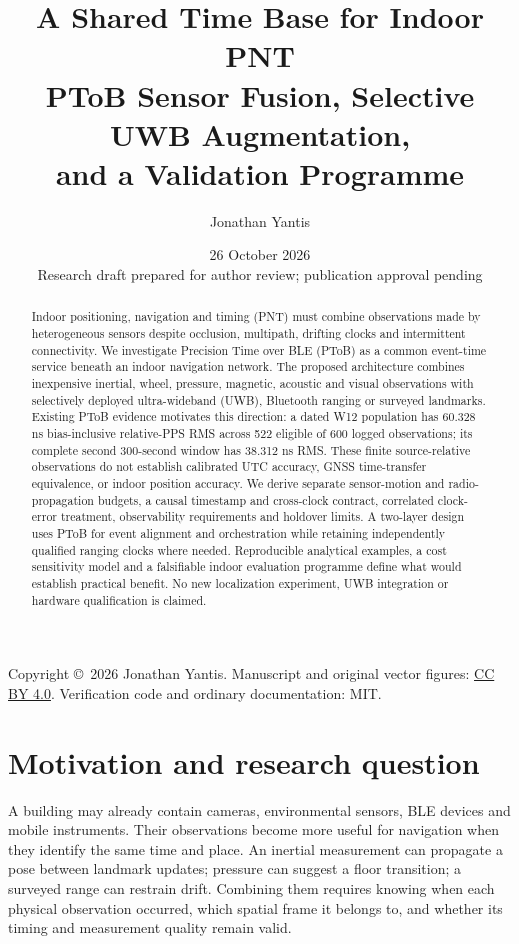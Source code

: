 \documentclass[11pt,letterpaper]{article}
\begin{document}
\title{\vspace{-1.3em}A Shared Time Base for Indoor PNT\\[5pt]\large PToB Sensor Fusion, Selective UWB Augmentation,\\and a Validation Programme}
\author{Jonathan Yantis}
\date{26 October 2026\\\small Research draft prepared for author review; publication approval pending}
\maketitle
\begin{abstract}
Indoor positioning, navigation and timing (PNT) must combine observations made by heterogeneous sensors despite occlusion, multipath, drifting clocks and intermittent connectivity. We investigate Precision Time over BLE (PToB) as a common event-time service beneath an indoor navigation network. The proposed architecture combines inexpensive inertial, wheel, pressure, magnetic, acoustic and visual observations with selectively deployed ultra-wideband (UWB), Bluetooth ranging or surveyed landmarks. Existing PToB evidence motivates this direction: a dated W12 population has 60.328 ns bias-inclusive relative-PPS RMS across 522 eligible of 600 logged observations; its complete second 300-second window has 38.312 ns RMS. These finite source-relative observations do not establish calibrated UTC accuracy, GNSS time-transfer equivalence, or indoor position accuracy. We derive separate sensor-motion and radio-propagation budgets, a causal timestamp and cross-clock contract, correlated clock-error treatment, observability requirements and holdover limits. A two-layer design uses PToB for event alignment and orchestration while retaining independently qualified ranging clocks where needed. Reproducible analytical examples, a cost sensitivity model and a falsifiable indoor evaluation programme define what would establish practical benefit. No new localization experiment, UWB integration or hardware qualification is claimed.
\end{abstract}
\noindent\small Copyright \copyright\ 2026 Jonathan Yantis. Manuscript and original vector figures: \href{https://creativecommons.org/licenses/by/4.0/}{CC BY 4.0}. Verification code and ordinary documentation: MIT.\normalsize

\section{Motivation and research question}
A building may already contain cameras, environmental sensors, BLE devices and mobile instruments. Their observations become more useful for navigation when they identify the same time and place. An inertial measurement can propagate a pose between landmark updates; pressure can suggest a floor transition; a surveyed range can restrain drift. Combining them requires knowing when each physical observation occurred, which spatial frame it belongs to, and whether its timing and measurement quality remain valid.
\end{document}
